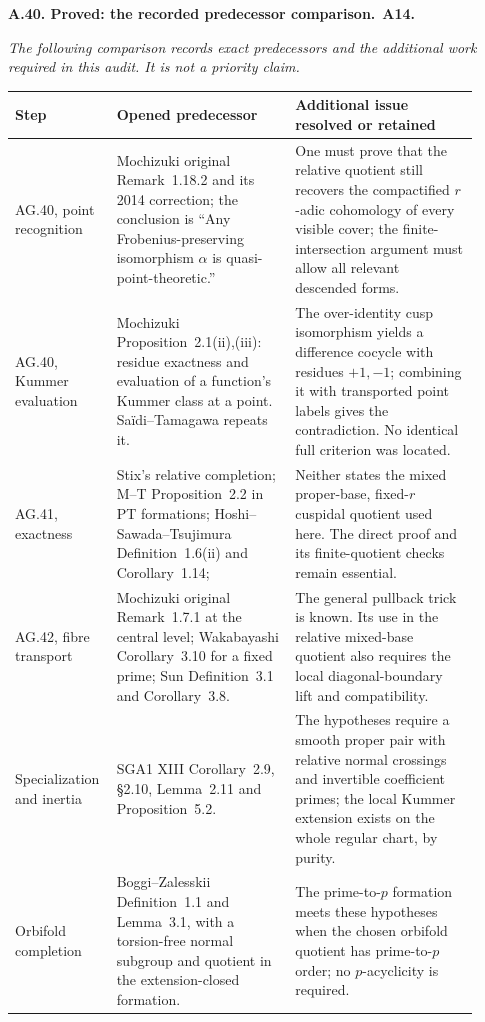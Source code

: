 \documentclass[11pt,a4paper]{article}
\newenvironment{claim}[3]{\par\medskip\noindent\hypertarget{#1}{\textbf{#1. #2.}}\ \textbf{#3.}\par\nopagebreak\smallskip\begingroup\itshape}{\endgroup\par\smallskip}
\begin{document}
\begin{claim}{A.40}{Proved: the recorded predecessor comparison}{A14}
The following comparison records exact predecessors and the additional
work required in this audit. It is not a priority claim.
\end{claim}
\begin{center}\small
\begin{longtable}{p{0.17\linewidth}p{0.37\linewidth}p{0.38\linewidth}}
\toprule
Step&Opened predecessor&Additional issue resolved or retained\\\midrule
AG.40, point recognition&
Mochizuki original Remark~1.18.2 and its 2014 correction; the conclusion
is ``Any Frobenius-preserving isomorphism $\alpha$ is quasi-point-theoretic.''&
One must prove that the relative quotient still recovers the compactified
$r$-adic cohomology of every visible cover; the finite-intersection
argument must allow all relevant descended forms.\\
AG.40, Kummer evaluation&
Mochizuki Proposition~2.1(ii),(iii): residue exactness and evaluation of
a function's Kummer class at a point. Sa\"idi--Tamagawa repeats it.&
The over-identity cusp isomorphism yields a difference cocycle with
residues $+1,-1$; combining it with transported point labels gives the
contradiction. No identical full criterion was located.\\
AG.41, exactness&
Stix's relative completion; M--T Proposition~2.2 in PT formations;
Hoshi--Sawada--Tsujimura Definition~1.6(ii) and Corollary~1.14;&
Neither states the mixed proper-base, fixed-$r$ cuspidal quotient used
here. The direct proof and its finite-quotient checks remain essential.\\
AG.42, fibre transport&
Mochizuki original Remark~1.7.1 at the central level; Wakabayashi
Corollary~3.10 for a fixed prime; Sun Definition~3.1 and Corollary~3.8.&
The general pullback trick is known. Its use in the relative mixed-base
quotient also requires the local diagonal-boundary lift and compatibility.\\
Specialization and inertia&
SGA1 XIII Corollary~2.9, \S2.10, Lemma~2.11 and Proposition~5.2.&
The hypotheses require a smooth proper pair with relative normal crossings
and invertible coefficient primes; the local Kummer extension exists on
the whole regular chart, by purity.\\
Orbifold completion&
Boggi--Zalesskii Definition~1.1 and Lemma~3.1, with a torsion-free normal
subgroup and quotient in the extension-closed formation.&
The prime-to-$p$ formation meets these hypotheses when the chosen
orbifold quotient has prime-to-$p$ order; no $p$-acyclicity is required.\\
\bottomrule
\end{longtable}
\end{center}
\end{document}

